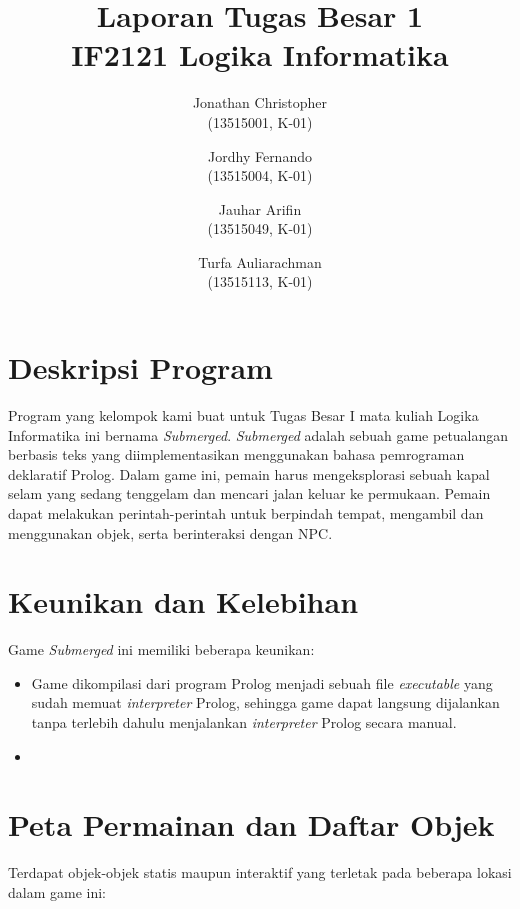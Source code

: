 \documentclass[a4paper,titlepage]{article}
\begin{document}
	\title{Laporan Tugas Besar 1 \\ IF2121 Logika Informatika}
	\author{
			Jonathan Christopher \\
			(13515001, K-01)
		\and
			Jordhy Fernando \\
			(13515004, K-01)
		\and
			Jauhar Arifin \\
			(13515049, K-01)
		\and
			Turfa Auliarachman \\
			(13515113, K-01)
	}
	\maketitle

	\section{Deskripsi Program}

		Program yang kelompok kami buat untuk Tugas Besar I mata kuliah Logika Informatika ini bernama \textit{Submerged}. \textit{Submerged} adalah sebuah game petualangan berbasis teks yang diimplementasikan menggunakan bahasa pemrograman deklaratif Prolog. Dalam game ini, pemain harus mengeksplorasi sebuah kapal selam yang sedang tenggelam dan mencari jalan keluar ke permukaan. Pemain dapat melakukan perintah-perintah untuk berpindah tempat, mengambil dan menggunakan objek, serta berinteraksi dengan NPC.

	\section{Keunikan dan Kelebihan}

		Game \textit{Submerged} ini memiliki beberapa keunikan:

		\begin{itemize}
			\item Game dikompilasi dari program Prolog menjadi sebuah file \textit{executable} yang sudah memuat \textit{interpreter} Prolog, sehingga game dapat langsung dijalankan tanpa terlebih dahulu menjalankan \textit{interpreter} Prolog secara manual.
			\item 
		\end{itemize}

	\section{Peta Permainan dan Daftar Objek}

		\noindent Terdapat objek-objek statis maupun interaktif yang terletak pada beberapa lokasi dalam game ini:
\end{document}
